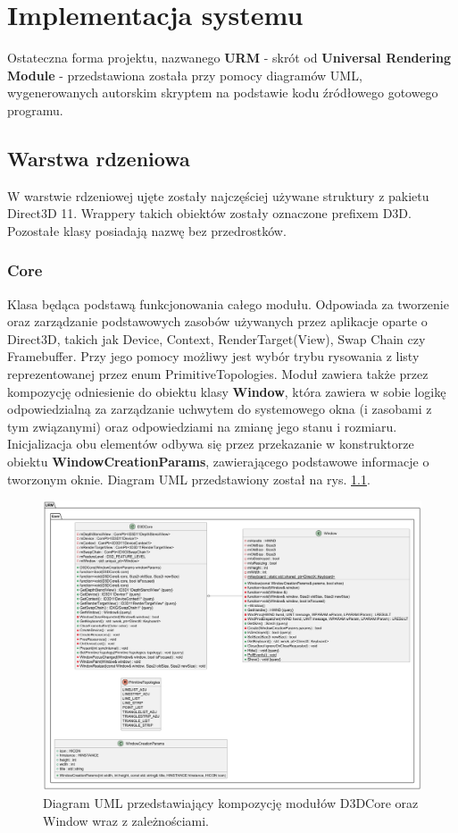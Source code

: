 \chapter{Implementacja systemu}
	Ostateczna forma projektu, nazwanego \textbf{URM} - skrót od \textbf{Universal Rendering Module} - przedstawiona została przy pomocy diagramów UML, wygenerowanych autorskim skryptem na podstawie kodu źródłowego gotowego programu.

\section{Warstwa rdzeniowa}
	W warstwie rdzeniowej ujęte zostały najczęściej używane struktury z pakietu Direct3D 11. Wrappery takich obiektów zostały oznaczone prefixem D3D. Pozostałe klasy posiadają nazwę bez przedrostków.

\subsection{Core}
	Klasa będąca podstawą funkcjonowania całego modułu. 
	Odpowiada za tworzenie oraz zarządzanie podstawowych zasobów używanych przez aplikacje oparte o Direct3D, takich jak Device, Context, RenderTarget(View), Swap Chain czy Framebuffer. Przy jego pomocy możliwy jest wybór trybu rysowania z listy reprezentowanej przez enum PrimitiveTopologies.
	Moduł zawiera także przez kompozycję odniesienie do obiektu klasy \textbf{Window}, która zawiera w sobie logikę odpowiedzialną za zarządzanie uchwytem do systemowego okna (i zasobami z tym związanymi) oraz odpowiedziami na zmianę jego stanu i rozmiaru.
	Inicjalizacja obu elementów odbywa się przez przekazanie w konstruktorze obiektu \textbf{WindowCreationParams}, zawierającego podstawowe informacje o tworzonym oknie.
	Diagram UML przedstawiony został na rys. \ref{UML_D3DCore}.
	
	
	\begin{figure}[ht!]
		\centering
		\includegraphics[width=\textwidth]{images/UML/core.png}
		\caption{Diagram UML przedstawiający kompozycję modułów D3DCore oraz Window wraz z zależnościami.}
		\label{UML_D3DCore}
	\end{figure}
	
